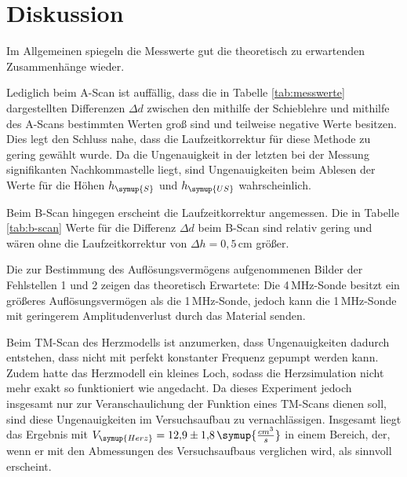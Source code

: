 \newpage
\section{Diskussion}
\label{sec:Diskussion}
Im Allgemeinen spiegeln die Messwerte gut die theoretisch zu erwartenden
Zusammenhänge wieder.

Lediglich beim A-Scan ist auffällig, dass die in Tabelle \ref{tab:messwerte}
dargestellten Differenzen $\Delta d$ zwischen den mithilfe der Schieblehre
und mithilfe des A-Scans bestimmten Werten groß sind und teilweise negative
Werte besitzen. Dies legt den Schluss nahe, dass die Laufzeitkorrektur für
diese Methode zu gering gewählt wurde. Da die Ungenauigkeit
in der letzten bei der Messung signifikanten Nachkommastelle liegt, sind Ungenauigkeiten
beim Ablesen der Werte für die Höhen $h_{\symup{S}}$ und $h_{\symup{US}}$ wahrscheinlich.

Beim B-Scan hingegen erscheint die Laufzeitkorrektur angemessen. Die in Tabelle
\ref{tab:b-scan} Werte für die Differenz $\Delta d$ beim B-Scan sind relativ gering
und wären ohne die Laufzeitkorrektur von $\Delta h=0{,}5\,$cm größer.

Die zur Bestimmung des Auflösungsvermögens aufgenommenen Bilder der Fehlstellen 1
und 2 zeigen das theoretisch Erwartete: Die 4\,MHz-Sonde besitzt ein größeres
Auflösungsvermögen als die 1\,MHz-Sonde, jedoch kann die 1\,MHz-Sonde mit geringerem
Amplitudenverlust durch das Material senden.

Beim TM-Scan des Herzmodells ist anzumerken, dass Ungenauigkeiten dadurch entstehen,
dass nicht mit perfekt konstanter Frequenz gepumpt werden kann. Zudem hatte das
Herzmodell ein kleines Loch, sodass die Herzsimulation nicht mehr exakt so funktioniert
wie angedacht. Da dieses Experiment jedoch insgesamt nur zur Veranschaulichung der
Funktion eines TM-Scans dienen soll, sind diese Ungenauigkeiten im Versuchsaufbau
zu vernachlässigen. Insgesamt liegt das Ergebnis mit $V_{\symup{Herz}}=12{,}9\pm1{,}8\,
\symup{\frac{cm^3}{s}}$ in einem Bereich, der, wenn er mit den Abmessungen des
Versuchsaufbaus verglichen wird, als sinnvoll erscheint.
